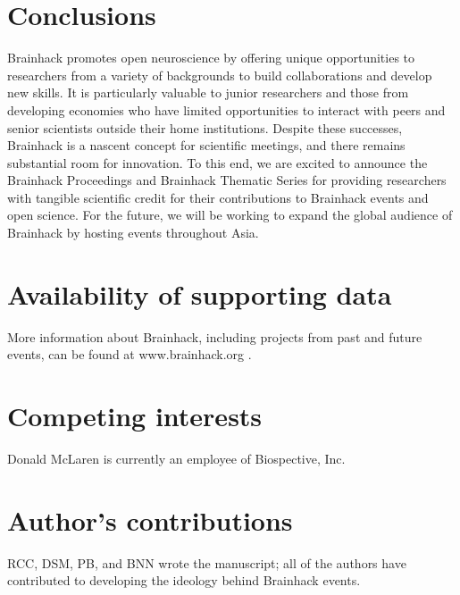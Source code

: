 \documentclass[11pt]{bmc_article_s50}
\begin{document}
\section*{Conclusions}

Brainhack promotes open neuroscience by offering unique opportunities to researchers from a variety of backgrounds to build collaborations and develop new skills. It is particularly valuable to junior researchers and those from developing economies who have limited opportunities to interact with peers and senior scientists outside their home institutions. Despite these successes, Brainhack is a nascent concept for scientific meetings, and there remains substantial room for innovation. To this end, we are excited to announce the Brainhack Proceedings and Brainhack Thematic Series for providing researchers with tangible scientific credit for their contributions to Brainhack events and open science. For the future, we will be working to expand the global audience of Brainhack by hosting events throughout Asia.


\section*{Availability of supporting data}
More information about Brainhack, including projects from past and future events, can be found at www.brainhack.org \cite{brainhackorg}.

\section*{Competing interests}
Donald McLaren is currently an employee of Biospective, Inc.

\section*{Author's contributions}
RCC, DSM, PB, and BNN wrote the manuscript; %
 all of the authors have contributed to developing the ideology behind Brainhack events.
\end{document}
